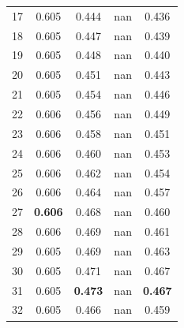 \documentclass[11pt,a4paper]{article}
\begin{document}
\begin{table}[H]
\begin{tabular}{rcccc}
17 & 0.605 & 0.444 & nan & 0.436 \\

18 & 0.605 & 0.447 & nan & 0.439 \\

19 & 0.605 & 0.448 & nan & 0.440 \\

20 & 0.605 & 0.451 & nan & 0.443 \\

21 & 0.605 & 0.454 & nan & 0.446 \\

22 & 0.606 & 0.456 & nan & 0.449 \\

23 & 0.606 & 0.458 & nan & 0.451 \\

24 & 0.606 & 0.460 & nan & 0.453 \\

25 & 0.606 & 0.462 & nan & 0.454 \\

26 & 0.606 & 0.464 & nan & 0.457 \\

27 & \textbf{0.606} & 0.468 & nan & 0.460 \\

28 & 0.606 & 0.469 & nan & 0.461 \\

29 & 0.605 & 0.469 & nan & 0.463 \\

30 & 0.605 & 0.471 & nan & 0.467 \\

31 & 0.605 & \textbf{0.473} & nan & \textbf{0.467} \\

32 & 0.605 & 0.466 & nan & 0.459 \\

\bottomrule

\end{tabular}

\end{table}
\end{document}
